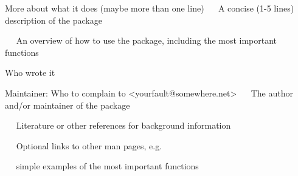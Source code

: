 \begin{Description}\relax
More about what it does (maybe more than one line)
~~ A concise (1-5 lines) description of the package ~~
\end{Description}
\begin{Details}\relax
{}
~~ An overview of how to use the package, including the most important functions ~~
\end{Details}
\begin{Author}\relax
Who wrote it

Maintainer: Who to complain to <yourfault@somewhere.net>
~~ The author and/or maintainer of the package ~~
\end{Author}
\begin{References}\relax
~~ Literature or other references for background information ~~
\end{References}
\begin{SeeAlso}\relax
~~ Optional links to other man pages, e.g. ~~
~~  ~~
\end{SeeAlso}
\begin{Examples}
\begin{ExampleCode}
~~ simple examples of the most important functions ~~
\end{ExampleCode}
\end{Examples}

